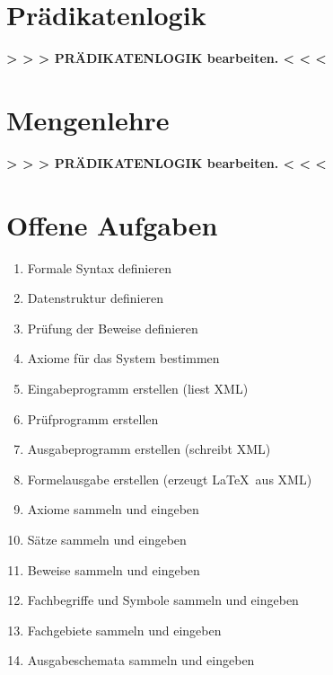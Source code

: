 \documentclass[english,ngerman,parskip=half,headsepline,footsepline]{scrreprt}
\begin{document}
	\section{Prädikatenlogik} %
	\label{Prädikatenlogik}

	\par \textbf{> > > PRÄDIKATENLOGIK bearbeiten. < < <} %

	\section{Mengenlehre} %
	\label{Mengenlehre}

	\par \textbf{> > > PRÄDIKATENLOGIK bearbeiten. < < <} %

	\section{Offene Aufgaben} %
	\label{Offene Aufgaben}

	\begin{enumerate}
		\item Formale Syntax definieren
		\item Datenstruktur definieren
		\item Prüfung der Beweise definieren
		\item Axiome für das System bestimmen
		\item Eingabeprogramm erstellen (liest XML)
		\item Prüfprogramm erstellen
		\item Ausgabeprogramm erstellen (schreibt XML)
		\item Formelausgabe erstellen (erzeugt \LaTeX\ aus XML)
		\item Axiome sammeln und eingeben
		\item Sätze sammeln und eingeben
		\item Beweise sammeln und eingeben
		\item Fachbegriffe und Symbole sammeln und eingeben
		\item Fachgebiete sammeln und eingeben
		\item Ausgabeschemata sammeln und eingeben
	\end{enumerate}

\end{document}

